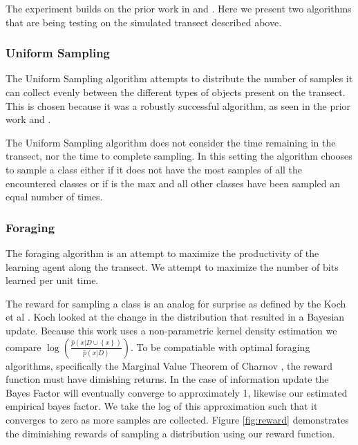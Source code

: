 The experiment builds on the prior work in \cite{furlong2014sequential} and \cite{furlong2014budgeting}.  Here we present two algorithms that are being testing on the simulated transect described above.

\subsubsection{Uniform Sampling}

The Uniform Sampling algorithm attempts to distribute the number of samples it
can collect evenly between the different types of objects present on the
transect.  This is chosen because it was a robustly successful algorithm, as
seen in the prior work \cite{furlong2014sequential} and \cite{furlong2014budgeting}.

The Uniform Sampling algorithm does not consider the time remaining in the
transect, nor the time to complete sampling.  In this setting the algorithm
chooses to sample a class either if it does not have the most samples of all
the encountered classes or if is the max and all other classes have been
sampled an equal number of times.

\subsubsection{Foraging}

The foraging algorithm is an attempt to maximize the productivity of the learning agent along the transect.  We attempt to maximize the number of bits learned per unit time.

The reward for sampling a class is an analog for surprise as
defined by the Koch et al \cite{itti2009bayesian}.  Koch looked at the change
in the distribution that resulted in a Bayesian update.  Because this work
uses a non-parametric kernel density estimation we compare
$\log\left(\frac{\hat{p}(x|D\cup \left\{x\right\})}{\hat{p}(x|D)}\right)$.  To
be compatiable with optimal foraging algorithms, specifically the Marginal
Value Theorem of Charnov \cite{charnov1976optimal}, the reward function must
have dimishing returns.  In the case of information update the Bayes Factor
will eventually converge to approximately 1, likewise our estimated empirical
bayes factor.  We take the log of this approximation such that it converges to
zero as more samples are collected.  Figure \ref{fig:reward} demonstrates the diminishing rewards of sampling a distribution using our reward function.



